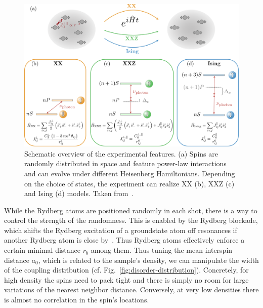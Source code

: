 \begin{figure}[htb]
	\centering
	\includegraphics[width=\textwidth]{gfx/part1/png/experiment_hamiltonians.png}
	\caption{Schematic overview of the experimental features. (a) Spins are randomly distributed in space and feature power-law interactions and can evolve under different Heisenberg Hamiltonians. Depending on the choice of states, the experiment can realize XX (b), XXZ (c) and Ising (d) models.
		Taken from~\cite{franzObservationAnisotropyindependentMagnetization2024}.}
	\label{fig:experimental-hamiltonians}
\end{figure}

While the Rydberg atoms are positioned randomly in each shot, there is a way to control the strength of the randomness. This is enabled by the Rydberg blockade, which shifts the Rydberg excitation of a groundstate atom off resonances if another Rydberg atom is close by~\cite{lukinDipoleBlockadeQuantum2001}. Thus Rydberg atoms effectively enforce a certain minimal distance $r_b$ among them. Thus tuning the mean interspin distance $a_0$, which is related to the sample's density, we can manipulate the width of the coupling distribution (cf. Fig.~\ref{fig:disorder-distribution}). Concretely, for high density the spins need to pack tight and there is simply no room for large variations of the nearest neighbor distance. Conversely, at very low densities there is almost no correlation in the spin's locations.

